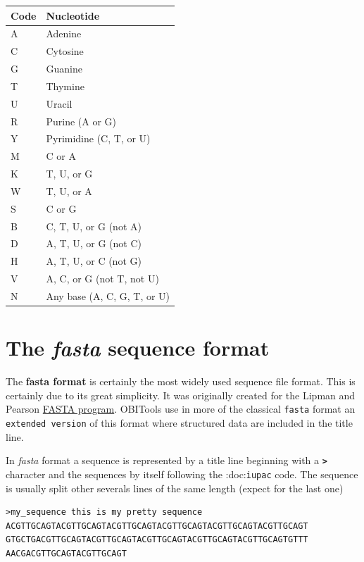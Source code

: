\documentclass[
  letterpaper,
  DIV=11,
  numbers=noendperiod]{scrreprt}
\begin{document}
\begin{longtable}[]{@{}ll@{}}
\toprule()
\textbf{Code} & \textbf{Nucleotide} \\
\midrule()
\endhead
A & Adenine \\
C & Cytosine \\
G & Guanine \\
T & Thymine \\
U & Uracil \\
R & Purine (A or G) \\
Y & Pyrimidine (C, T, or U) \\
M & C or A \\
K & T, U, or G \\
W & T, U, or A \\
S & C or G \\
B & C, T, U, or G (not A) \\
D & A, T, U, or G (not C) \\
H & A, T, U, or C (not G) \\
V & A, C, or G (not T, not U) \\
N & Any base (A, C, G, T, or U) \\
\bottomrule()
\end{longtable}

\hypertarget{sec-fasta}{%
\section{\texorpdfstring{The \emph{fasta} sequence
format}{The fasta sequence format}}\label{sec-fasta}}

The \textbf{fasta format} is certainly the most widely used sequence
file format. This is certainly due to its great simplicity. It was
originally created for the Lipman and Pearson
\href{http://www.ncbi.nlm.nih.gov/pubmed/3162770?dopt=Citation}{FASTA
program}. OBITools use in more of the classical \texttt{fasta} format an
\texttt{extended\ version} of this format where structured data are
included in the title line.

In \emph{fasta} format a sequence is represented by a title line
beginning with a \textbf{\texttt{\textgreater{}}} character and the
sequences by itself following the :doc:\texttt{iupac} code. The sequence
is usually split other severals lines of the same length (expect for the
last one)

\begin{verbatim}
>my_sequence this is my pretty sequence
ACGTTGCAGTACGTTGCAGTACGTTGCAGTACGTTGCAGTACGTTGCAGTACGTTGCAGT
GTGCTGACGTTGCAGTACGTTGCAGTACGTTGCAGTACGTTGCAGTACGTTGCAGTGTTT
AACGACGTTGCAGTACGTTGCAGT
\end{verbatim}
\end{document}
